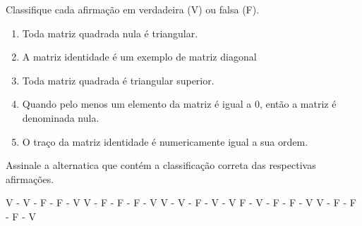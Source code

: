 Classifique cada afirmação em verdadeira (V) ou falsa (F).
\begin{enumerate}[(\quad)]
\item Toda matriz quadrada nula é triangular.
\item A matriz identidade é um exemplo de matriz diagonal
\item Toda matriz quadrada é triangular superior.
\item Quando pelo menos um elemento da matriz é igual a $0$, então a matriz é denominada nula.
\item O traço da matriz identidade é numericamente igual a sua ordem.
\end{enumerate}
Assinale a alternatica que contém a classificação correta das respectivas afirmações.

V - V - F - F - V
V - F - F - F - V
V - V - F - V - V
F - V - F - F - V
V - F - F - F - V


